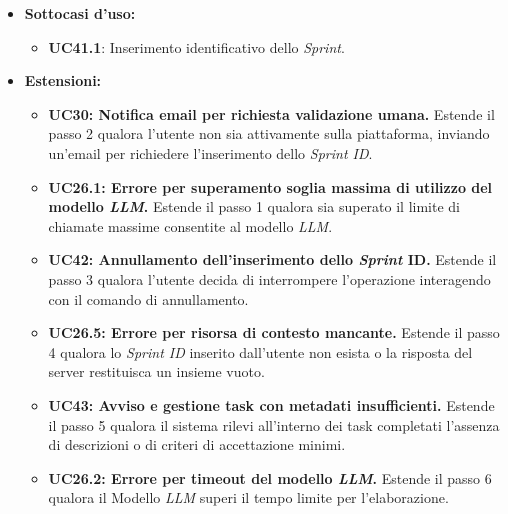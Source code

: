 \documentclass[12pt, a4paper]{article}
\begin{document}
\begin{itemize}
\begin{enumerate}
        \item Il sistema compone il prompt contestuale con i dati estratti e lo invia alle \textit{API} del Modello \textit{AI} richiedendo la sintesi in linguaggio ingegneristico standardizzato.
        \item Il Modello \textit{AI} restituisce al sistema il testo del Changelog formattato in \textit{Markdown}.
        \item Il sistema arricchisce il documento inserendo i collegamenti ipertestuali automatici verso i ticket originali sul sistema esterno.
        \item Il sistema registra il successo dell'attività, aggiorna lo stato a "Completato" (UC22.1.2) e rende disponibile all'utente il report contenente il testo generato (UC25).
    \end{enumerate}
    \item \textbf{Sottocasi d'uso:}
    \begin{itemize}
        \item \textbf{UC41.1}: Inserimento identificativo dello \textit{Sprint}.
    \end{itemize}
    \item \textbf{Estensioni:}
    \begin{itemize}
        \item \textbf{UC30: Notifica email per richiesta validazione umana.} Estende il passo 2 qualora l'utente non sia attivamente sulla piattaforma, inviando un'email per richiedere l'inserimento dello \textit{Sprint ID}.
        \item \textbf{UC26.1: Errore per superamento soglia massima di utilizzo del modello \textit{LLM}.} Estende il passo 1 qualora sia superato il limite di chiamate massime consentite al modello \textit{LLM}.
        \item \textbf{UC42: Annullamento dell'inserimento dello \textit{Sprint} ID.} Estende il passo 3 qualora l'utente decida di interrompere l'operazione interagendo con il comando di annullamento.
        \item \textbf{UC26.5: Errore per risorsa di contesto mancante.} Estende il passo 4 qualora lo \textit{Sprint ID} inserito dall'utente non esista o la risposta del server restituisca un insieme vuoto.
        \item \textbf{UC43: Avviso e gestione task con metadati insufficienti.} Estende il passo 5 qualora il sistema rilevi all'interno dei task completati l'assenza di descrizioni o di criteri di accettazione minimi.
        \item \textbf{UC26.2: Errore per timeout del modello \textit{LLM}.} Estende il passo 6 qualora il Modello \textit{LLM} superi il tempo limite per l'elaborazione.

\end{itemize}
\end{itemize}
\end{document}
